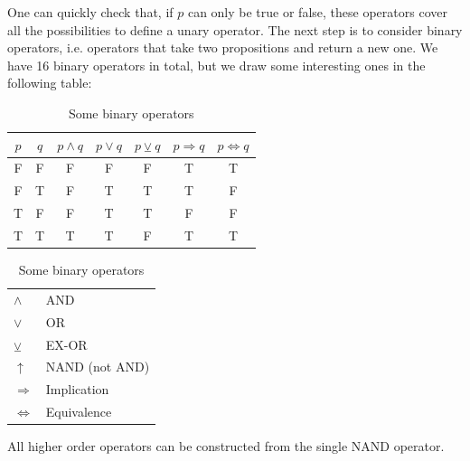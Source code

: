 \documentclass[root.tex]{subfiles}
\begin{document}
One can quickly check that, if $p$ can only be true or false, these operators cover all the possibilities to define a unary operator. The next step is to consider binary operators, i.e. operators that take two propositions and return a new one. We have 16 binary operators in total, but we draw some interesting ones in the following table:

    \begin{table}[h]
      \centering
      \begin{tabular}{c|c||c|c|c|c|c}
        $p$ & $q$ & $p\land q$ & $p\lor q$ & $p\veebar q$ & $p \Rightarrow q$ & $p \Leftrightarrow q$ \\
        \hline
          \rule{0pt}{12pt} F & F & F & F & F & T & T\\
                           F & T & F & T & T & T & F\\
                           T & F & F & T & T & F & F\\
                           T & T & T & T & F & T & T
      \end{tabular}\quad
      \begin{tabular}{ll}
        $\land$           & AND\\
        $\lor$            & OR\\
        $\veebar$         & EX-OR\\
        $\uparrow$        & NAND (not AND)\\
        $\Rightarrow$     & Implication\\
        $\Leftrightarrow$ & Equivalence
      \end{tabular}
      \caption{Some binary operators}
    \end{table}

\begin{remark}
  All higher order operators can be constructed from the single NAND operator.
\end{remark}
\end{document}
